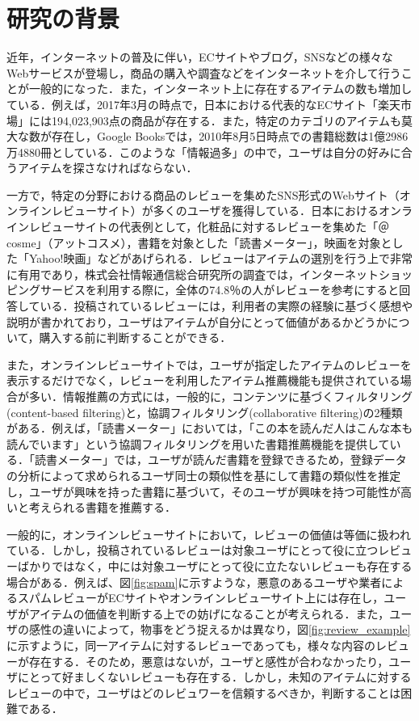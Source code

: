 \documentclass[a4paper,11pt,oneside,openany]{jsbook}
\begin{document}
	\section{研究の背景}
近年，インターネットの普及に伴い，ECサイトやブログ，SNSなどの様々なWebサービスが登場し，商品の購入や調査などをインターネットを介して行うことが一般的になった．また，インターネット上に存在するアイテムの数も増加している．例えば，2017年3月の時点で，日本における代表的なECサイト「楽天市場」\cite{rakuten}には194,023,903点の商品が存在する\cite{rakuten_info}．また，特定のカテゴリのアイテムも莫大な数が存在し，Google Booksでは，2010年8月5日時点での書籍総数は1億2986万4880冊としている\cite{google}．このような「情報過多」\cite{info}の中で，ユーザは自分の好みに合うアイテムを探さなければならない．
\par
一方で，特定の分野における商品のレビューを集めたSNS形式のWebサイト（オンラインレビューサイト）が多くのユーザを獲得している．日本におけるオンラインレビューサイトの代表例として，化粧品に対するレビューを集めた「＠cosme」（アットコスメ）\cite{@cosme}，書籍を対象とした「読書メーター」\cite{bookmeter}，映画を対象とした「Yahoo!映画」\cite{yahoo}などがあげられる．レビューはアイテムの選別を行う上で非常に有用であり，株式会社情報通信総合研究所の調査\cite{ict}では，インターネットショッピングサービスを利用する際に，全体の74.8％の人がレビューを参考にすると回答している．投稿されているレビューには，利用者の実際の経験に基づく感想や説明が書かれており，ユーザはアイテムが自分にとって価値があるかどうかについて，購入する前に判断することができる．
\par
また，オンラインレビューサイトでは，ユーザが指定したアイテムのレビューを表示するだけでなく，レビューを利用したアイテム推薦機能も提供されている場合が多い．情報推薦の方式には，一般的に，コンテンツに基づくフィルタリング(content-based filtering)と，協調フィルタリング(collaborative filtering)の2種類がある\cite{hijikata2}．例えば，「読書メーター」においては，「この本を読んだ人はこんな本も読んでいます」という協調フィルタリングを用いた書籍推薦機能を提供している．「読書メーター」では，ユーザが読んだ書籍を登録できるため，登録データの分析によって求められるユーザ同士の類似性を基にして書籍の類似性を推定し，ユーザが興味を持った書籍に基づいて，そのユーザが興味を持つ可能性が高いと考えられる書籍を推薦する．
\par
一般的に，オンラインレビューサイトにおいて，レビューの価値は等価に扱われている．しかし，投稿されているレビューは対象ユーザにとって役に立つレビューばかりではなく，中には対象ユーザにとって役に立たないレビューも存在する場合がある．例えば、図\ref{fig:spam}に示すような，悪意のあるユーザや業者によるスパムレビューがECサイトやオンラインレビューサイト上には存在し，ユーザがアイテムの価値を判断する上での妨げになることが考えられる．また，ユーザの感性の違いによって，物事をどう捉えるかは異なり，図\ref{fig:review_example}に示すように，同一アイテムに対するレビューであっても，様々な内容のレビューが存在する．そのため，悪意はないが，ユーザと感性が合わなかったり，ユーザにとって好ましくないレビューも存在する．しかし，未知のアイテムに対するレビューの中で，ユーザはどのレビュワーを信頼するべきか，判断することは困難である．
\end{document}
